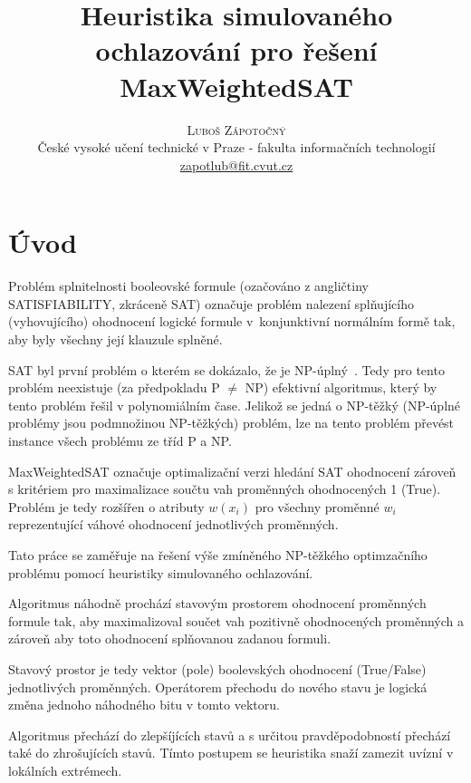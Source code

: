 \documentclass[twoside,twocolumn]{article}
\title{Heuristika simulovaného ochlazování pro řešení MaxWeightedSAT} %
\author{%
    \textsc{Luboš Zápotočný}\\[1ex] %
    \normalsize České vysoké učení technické v Praze - fakulta informačních technologií \\ %
    \normalsize \href{mailto:zapotlub@fit.cvut.cz}{zapotlub@fit.cvut.cz} %
}
\date{} %
\begin{document}
    \maketitle



    \section{Úvod}

    Problém splnitelnosti booleovské formule (ozačováno z angličtiny SATISFIABILITY, zkráceně SAT) označuje problém
    nalezení splňujícího (vyhovujícího) ohodnocení logické formule v~konjunktivní normálním formě tak, aby byly všechny její
    klauzule splněné.

    SAT byl první problém o kterém se dokázalo, že je NP-úplný~\cite{CookLevin1971}.
    Tedy pro tento problém neexistuje (za předpokladu P $\neq$ NP) efektivní algoritmus, který by tento problém řešil v polynomiálním čase.
    Jelikož se jedná o NP-těžký (NP-úplné problémy jsou podmnožinou NP-těžkých) problém, lze na tento problém převést instance všech problému ze tříd P a NP.

    MaxWeightedSAT označuje optimalizační verzi hledání SAT ohodnocení zároveň s kritériem pro maximalizace součtu
    vah proměnných ohodnocených 1 (True).
    Problém je tedy rozšířen o atributy $w(x_i)$ pro všechny proměnné $w_i$ reprezentující váhové ohodnocení jednotlivých
    proměnných.

    Tato práce se zaměřuje na řešení výše zmíněného NP-těžkého optimzačního problému pomocí heuristiky simulovaného ochlazování.

    Algoritmus náhodně prochází stavovým prostorem ohodnocení proměnných formule tak, aby maximalizoval součet vah pozitivně
    ohodnocených proměnných a zároveň aby toto ohodnocení splňovanou zadanou formuli.

    Stavový prostor je tedy vektor (pole) boolevských ohodnocení (True/False) jednotlivých proměnných.
    Operátorem přechodu do nového stavu je logická změna jednoho náhodného bitu v tomto vektoru.

    Algoritmus přechází do zlepšíjících stavů a s určitou pravděpodobností přechází také do zhrošujících stavů.
    Tímto postupem se heuristika snaží zamezit uvízní v lokálních extrémech.
\end{document}
